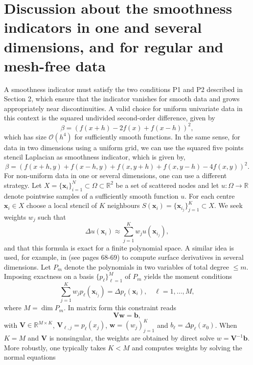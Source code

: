 \documentclass[preprint]{elsarticle}       %
\begin{document}
\section{Discussion about the smoothness indicators in one and several dimensions, and for regular and mesh-free data}\label{si_sec}


A smoothness indicator must satisfy the two conditions P1 and P2 described in Section 2, which ensure that the indicator vanishes for smooth data and grows appropriately near discontinuities. A valid choice for uniform univariate data in this context is the squared undivided second-order difference, given by
\begin{equation}\label{ud1}
\beta = \left( f(x+h) - 2f(x) + f(x-h) \right)^2,
\end{equation}
which has size $\mathcal{O}(h^4)$ for sufficiently smooth functions. In the same sense, for data in two dimensions using a uniform grid, we can use the squared five points stencil Laplacian as smoothness indicator, which is given by,
\begin{equation}\label{ud2}
\beta = \left( f(x+h, y) + f(x-h, y) + f(x, y+h) + f(x, y-h) - 4f(x, y) \right)^2.
\end{equation}
For non-uniform data in one or several dimensions, one can use a different strategy. 
Let $X = \{\mathbf{x}_i\}_{i=1}^N \subset \Omega \subset \mathbb{R}^2$ be a set of scattered nodes and let $u : \Omega \to \mathbb{R}$ denote pointwise samples of a sufficiently smooth function $u$. For each centre $\mathbf{x}_i \in X$ choose a local stencil of $K$ neighbours $S(\mathbf{x}_i) = \{\mathbf{x}_{i_j}\}_{j=1}^K\subset X$. We seek weights $w_j$ such that
\[
\Delta u(\mathbf{x}_i) \approx \sum_{j=1}^K w_j u(\mathbf{x}_{i_j}),
\]
and that this formula is exact for a finite polynomial space. A similar idea is used, for example, in \cite{LiIto2006} (see pages 68-69) to compute surface derivatives in several dimensions. Let $P_m$ denote the polynomials in two variables of total degree $\leq m$. Imposing exactness on a basis $\{p_\ell\}_{\ell=1}^M$ of $P_m$ yields the moment conditions
\[
\sum_{j=1}^K w_j p_\ell(\mathbf{x}_{i_j}) = \Delta p_\ell(\mathbf{x}_i), \quad \ell = 1, \dots, M,
\]
where $M = \dim P_m$. In matrix form this constraint reads
\[
\mathbf{V} \mathbf{w} = \mathbf{b},
\]
with $\mathbf{V} \in \mathbb{R}^{M \times K}$, $\mathbf{V}_{\ell,j} = p_\ell(x_j)$, $\mathbf{w} = (w_j)_{j=1}^K$ and $b_\ell = \Delta p_\ell(x_0)$. When $K = M$ and $\mathbf{V}$ is nonsingular, the weights are obtained by direct solve $w = \mathbf{V}^{-1} \mathbf{b}$. More robustly, one typically takes $K < M$ and computes weights by solving the normal equations
\end{document}
